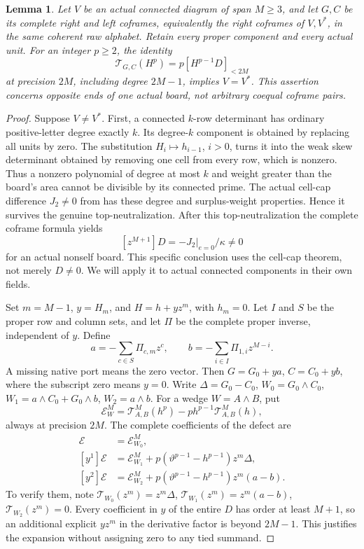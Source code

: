 \documentclass[11pt,a4paper]{amsart}
\numberwithin{equation}{section}
\theoremstyle{plain}
\newtheorem{lemma}[theorem]{Lemma}
\theoremstyle{definition}
\begin{document}
\begin{lemma}\label{ph:unshifted-exclusion}
Let \(V\) be an actual connected diagram of span \(M\ge3\), and
let \(G,C\) be its complete right and left coframes, equivalently
the right coframes of \(V,V^*\), in the same coherent raw alphabet.
Retain every proper component and every actual unit.  For an integer
\(p\ge2\), the identity
\[
 \mathcal T_{G,C}(H^p)=p[H^{p-1}D]_{<2M}
\]
at precision \(2M\), including degree \(2M-1\), implies \(V=V^*\).
This assertion concerns opposite ends of one actual board, not
arbitrary coequal coframe pairs.
\end{lemma}
\begin{proof}
Suppose \(V\ne V^*\).
First, a connected \(k\)-row determinant has ordinary positive-letter
degree exactly \(k\).  Its degree-\(k\) component is obtained by replacing
all units by zero.  The substitution \(H_i\mapsto h_{i-1}\), \(i>0\),
turns it into the weak skew determinant obtained by removing one cell
from every row, which is nonzero.  Thus a nonzero polynomial of degree
at most \(k\) and weight greater than the board's area cannot be
divisible by its connected prime.
The actual cell-cap difference \(J_2\ne0\) from
 has these degree and surplus-weight
properties.  Hence it survives the genuine top-neutralization.
After this top-neutralization the complete coframe formula yields
\begin{equation}\label{ph:first-D}
 [z^{M+1}]D=-J_2|_{e=0}/\kappa\ne0
\end{equation}
for an actual nonself board.  This specific conclusion uses the
cell-cap theorem, not merely \(D\ne0\).  We will apply it to actual
connected components in their own fields.

Set \(m=M-1\), \(y=H_m\), and \(H=h+yz^m\), with \(h_m=0\).
Let \(I\) and \(S\) be the proper row and column sets, and let \(\Pi\)
be the complete proper inverse, independent of \(y\).
Define
\[
 a=-\sum_{c\in S}\Pi_{c,m}z^c,\qquad
 b=-\sum_{i\in I}\Pi_{1,i}z^{M-i}.
\]
A missing native port means the zero vector.
Then \(G=G_0+ya\), \(C=C_0+yb\), where the subscript zero means
\(y=0\).  Write \(\Delta=G_0-C_0\),
\(W_0=G_0\wedge C_0\),
\(W_1=a\wedge C_0+G_0\wedge b\), \(W_2=a\wedge b\).
For a wedge \(W=A\wedge B\), put
\[
 \mathcal{E}^{M}_W
   =\mathcal{T}^{M}_{A,B}(h^p)-p h^{p-1}\mathcal{T}^{M}_{A,B}(h),
\]
always at precision \(2M\).
The complete coefficients of the defect are
\begin{align*}
 [y^0]\mathcal{E}&=\mathcal{E}^{M}_{W_0},\\
 [y^1]\mathcal{E}&=\mathcal{E}^{M}_{W_1}
           +p(\vartheta^{p-1}-h^{p-1})z^m\Delta,\\
 [y^2]\mathcal{E}&=\mathcal{E}^{M}_{W_2}
           +p(\vartheta^{p-1}-h^{p-1})z^m(a-b).
\end{align*}
To verify them, note
\(\mathcal{T}_{W_0}(z^m)=z^m\Delta\),
\(\mathcal{T}_{W_1}(z^m)=z^m(a-b)\),
\(\mathcal{T}_{W_2}(z^m)=0\).
Every coefficient in \(y\) of the entire \(D\) has order at least
\(M+1\), so an additional explicit \(yz^m\) in the derivative factor
is beyond \(2M-1\).  This justifies the expansion without assigning
zero to any tied summand.


\end{proof}
\end{document}
